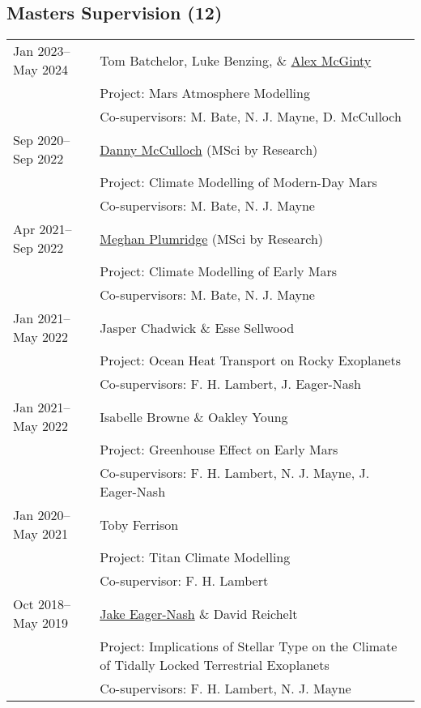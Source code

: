 \documentclass[a4paper, 11pt]{article}
\begin{document}
\subsection*{Masters Supervision (12)}
\begin{tabularx}{\linewidth}{@{}l X@{}}
Jan 2023--May 2024 & Tom Batchelor, Luke Benzing, \& \ul{Alex McGinty} \\
                   & Project: Mars Atmosphere Modelling \\
                   & Co-supervisors: M. Bate, N. J. Mayne, D. McCulloch \\
Sep 2020--Sep 2022 & \ul{Danny McCulloch} (MSci by Research) \\
                   & Project: Climate Modelling of Modern-Day Mars \\
                   & Co-supervisors: M. Bate, N. J. Mayne \\
Apr 2021--Sep 2022 & \ul{Meghan Plumridge} (MSci by Research) \\
                   & Project: Climate Modelling of Early Mars \\
                   & Co-supervisors: M. Bate, N. J. Mayne \\
Jan 2021--May 2022 & Jasper Chadwick \& Esse Sellwood \\
                   & Project: Ocean Heat Transport on Rocky Exoplanets \\
                   & Co-supervisors: F. H. Lambert, J. Eager-Nash \\
Jan 2021--May 2022 & Isabelle Browne \& Oakley Young \\
                   & Project: Greenhouse Effect on Early Mars \\
                   & Co-supervisors: F. H. Lambert, N. J. Mayne, J. Eager-Nash \\
Jan 2020--May 2021 & Toby Ferrison \\
                   & Project: Titan Climate Modelling \\
                   & Co-supervisor: F. H. Lambert \\
Oct 2018--May 2019 & \ul{Jake Eager-Nash} \& David Reichelt \\
                   & Project: Implications of Stellar Type on the Climate of Tidally Locked Terrestrial Exoplanets \\
                   & Co-supervisors: F. H. Lambert, N. J. Mayne \\
\end{tabularx}
\vspace{-10pt}
\end{document}
